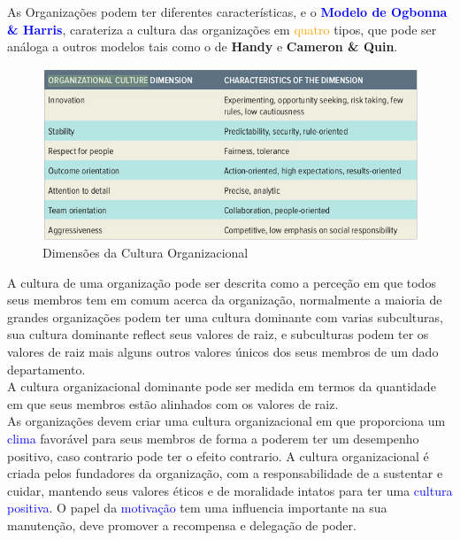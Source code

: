 {As Organizações podem ter diferentes características, e o \textcolor{blue}{\textbf{Modelo de Ogbonna \& Harris}}, carateriza a cultura das organizações em \textcolor{orange}{quatro} tipos, que pode ser análoga a outros modelos tais como o de \textbf{Handy} e \textbf{Cameron \& Quin}.\\
\begin{figure}[H]
\flushleft
\captionsetup{justification=raggedright,singlelinecheck=false}
\includegraphics[scale=0.4]{./image/OB/OC_Dimensions.jpg}
\caption{Dimensões da Cultura Organizacional}
\end{figure}\par
A cultura de uma organização pode ser descrita como a perceção em que todos seus membros tem em comum acerca da organização, normalmente a maioria de grandes organizações podem ter uma cultura dominante com varias subculturas, sua cultura dominante reflect seus valores de raiz, e subculturas podem ter os valores de raiz mais alguns outros valores únicos dos seus membros de um dado departamento. \\
A cultura organizacional dominante pode ser medida em termos da quantidade em que seus membros estão alinhados com os valores de raiz. \\
As organizações devem criar uma cultura organizacional em que proporciona um \textcolor{blue}{clima} favorável para seus membros de forma a poderem ter um desempenho positivo, caso contrario pode ter o efeito contrario. A cultura organizacional é criada pelos fundadores da organização, com a responsabilidade de a sustentar e cuidar, mantendo seus valores éticos e de moralidade intatos para ter uma \textcolor{blue}{cultura positiva}. O papel da \textcolor{blue}{motivação} tem uma influencia importante na sua manutenção, deve promover a recompensa e delegação de poder. \\




}
